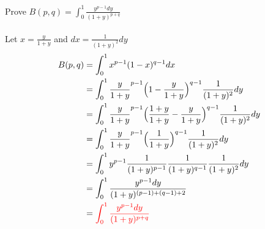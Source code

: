 \item [2.] Prove  \( \displaystyle B(p,q)=\int_0^1 \frac{y^{p-1}dy}{(1+y)^{p+q}} \)\\
\\[2mm] Let $ \displaystyle x=\frac{y}{1+y}$ and $\displaystyle dx = \frac{1}{(1+y)^2}dy$
\begin{align*}
    B(p,q)&=\int_0^1 x^{p-1}(1-x)^{q-1}dx\\
    &=\int_0^1 \frac{y}{1+y}^{p-1}\Big(1-\frac{y}{1+y}\Big)^{q-1}\frac{1}{(1+y)^2}dy\\
    &=\int_0^1 \frac{y}{1+y}^{p-1}\Big(\frac{1+y}{1+y}-\frac{y}{1+y}\Big)^{q-1}\frac{1}{(1+y)^2}dy\\
    &=\int_0^1 \frac{y}{1+y}^{p-1}\Big(\frac{1}{1+y}\Big)^{q-1}\frac{1}{(1+y)^2}dy\\
    &=\int_0^1 y^{p-1}\frac{1}{(1+y)^{p-1}}\frac{1}{(1+y)^{q-1}}\frac{1}{(1+y)^2}dy\\
    &=\int_0^1 \frac{y^{p-1}dy}{(1+y)^{(p-1)+(q-1)+2}}\\
    &=\textcolor{red}{\int_0^1 \frac{y^{p-1}dy}{(1+y)^{p+q}}}
\end{align*}